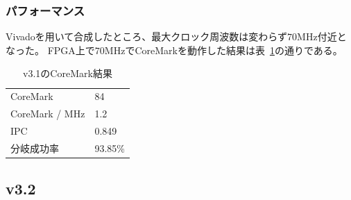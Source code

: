 \documentclass[dvipdfmx,10pt,a4paper,titlepage]{jsarticle}
\begin{document}
    \subsubsection{パフォーマンス}
    Vivadoを用いて合成したところ、最大クロック周波数は変わらず$70\mathrm{MHz}$付近となった。
    FPGA上で$70\mathrm{MHz}$でCoreMarkを動作した結果は表~\ref{tab:v3.1}の通りである。
    \begin{table}[h]
        \begin{center}
            \caption{v3.1のCoreMark結果}\label{tab:v3.1}
            \begin{tabular}{ll}
                CoreMark & 84 \\
                CoreMark / MHz & 1.2 \\
                IPC & 0.849 \\
                分岐成功率 & 93.85\% \\
            \end{tabular}
        \end{center}
    \end{table}
    \subsection{v3.2}
\end{document}
